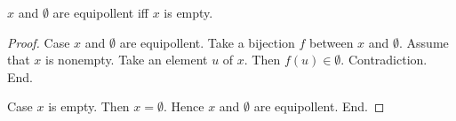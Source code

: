 \documentclass[../../basic-notions.ftl.tex]{subfiles}
\begin{document}
\begin{forthel}
    \begin{proposition}[SF 01 07 430789]
      $x$ and $\emptyset$ are equipollent iff $x$ is empty.
    \end{proposition}
    \begin{proof}
      Case $x$ and $\emptyset$ are equipollent.
        Take a bijection $f$ between $x$ and $\emptyset$.
        Assume that $x$ is nonempty.
        Take an element $u$ of $x$.
        Then $f(u) \in \emptyset$.
        Contradiction.
      End.

      Case $x$ is empty.
        Then $x = \emptyset$.
        Hence $x$ and $\emptyset$ are equipollent.
      End.
    \end{proof}
  \end{forthel}
\end{document}

